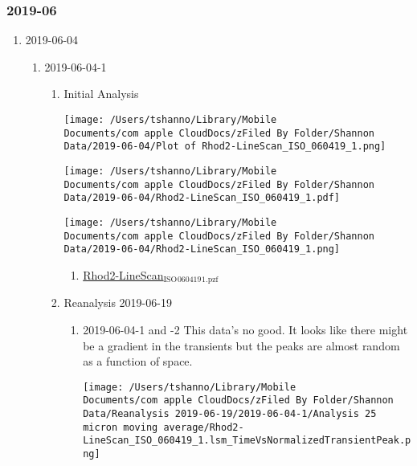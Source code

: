 \documentclass[11pt]{article}
\begin{document}
\subsubsection{2019-06}
\label{sec:orgff526fb}
\begin{enumerate}
\item 2019-06-04
\label{sec:org5e22c6b}
\begin{enumerate}
\item 2019-06-04-1
\label{sec:org3204071}
\begin{enumerate}
\item Initial Analysis
\label{sec:orgc60d0ba}
\begin{center}
\texttt{[image: /Users/tshanno/Library/Mobile Documents/com~apple~CloudDocs/zFiled By Folder/Shannon Data/2019-06-04/Plot of Rhod2-LineScan\_ISO\_060419\_1.png]}
\end{center}
\begin{center}
\texttt{[image: /Users/tshanno/Library/Mobile Documents/com~apple~CloudDocs/zFiled By Folder/Shannon Data/2019-06-04/Rhod2-LineScan\_ISO\_060419\_1.pdf]}
\end{center}
\begin{center}
\texttt{[image: /Users/tshanno/Library/Mobile Documents/com~apple~CloudDocs/zFiled By Folder/Shannon Data/2019-06-04/Rhod2-LineScan\_ISO\_060419\_1.png]}
\end{center}
\begin{enumerate}
\item \href{file:///Users/tshanno/Library/Mobile Documents/com\~apple\~CloudDocs/zFiled By Folder/Shannon Data/2019-06-04/Rhod2-LineScan\_ISO\_060419\_1.pzf}{Rhod2-LineScan\(_{\text{ISO}}\)\(_{\text{060419}}\)\(_{\text{1.pzf}}\)}
\label{sec:org62dd5a0}
\end{enumerate}
\item Reanalysis 2019-06-19
\label{sec:orga55955f}
\begin{enumerate}
\item 2019-06-04-1 and -2 This data's no good.  It looks like there might be a gradient in the transients but the peaks are almost random as a function of space.
\label{sec:org698e9f2}
\begin{center}
\texttt{[image: /Users/tshanno/Library/Mobile Documents/com~apple~CloudDocs/zFiled By Folder/Shannon Data/Reanalysis 2019-06-19/2019-06-04-1/Analysis 25 micron moving average/Rhod2-LineScan\_ISO\_060419\_1.lsm\_TimeVsNormalizedTransientPeak.png]}
\end{center}

\end{enumerate}
\end{enumerate}
\end{enumerate}
\end{enumerate}
\end{document}
